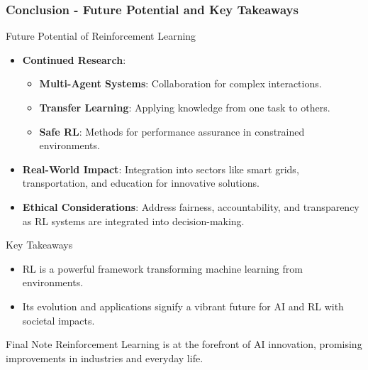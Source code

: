 \documentclass{beamer}
\begin{document}
\begin{frame}[fragile]
    \frametitle{Conclusion - Future Potential and Key Takeaways}
    \begin{block}{Future Potential of Reinforcement Learning}
        \begin{itemize}
            \item \textbf{Continued Research}:
                \begin{itemize}
                    \item \textbf{Multi-Agent Systems}: Collaboration for complex interactions.
                    \item \textbf{Transfer Learning}: Applying knowledge from one task to others.
                    \item \textbf{Safe RL}: Methods for performance assurance in constrained environments.
                \end{itemize}
            \item \textbf{Real-World Impact}: Integration into sectors like smart grids, transportation, and education for innovative solutions.
            \item \textbf{Ethical Considerations}: Address fairness, accountability, and transparency as RL systems are integrated into decision-making.
        \end{itemize}
    \end{block}

    \begin{block}{Key Takeaways}
        \begin{itemize}
            \item RL is a powerful framework transforming machine learning from environments.
            \item Its evolution and applications signify a vibrant future for AI and RL with societal impacts.
        \end{itemize}
    \end{block}

    \begin{block}{Final Note}
        Reinforcement Learning is at the forefront of AI innovation, promising improvements in industries and everyday life.
    \end{block}
\end{frame}
\end{document}
